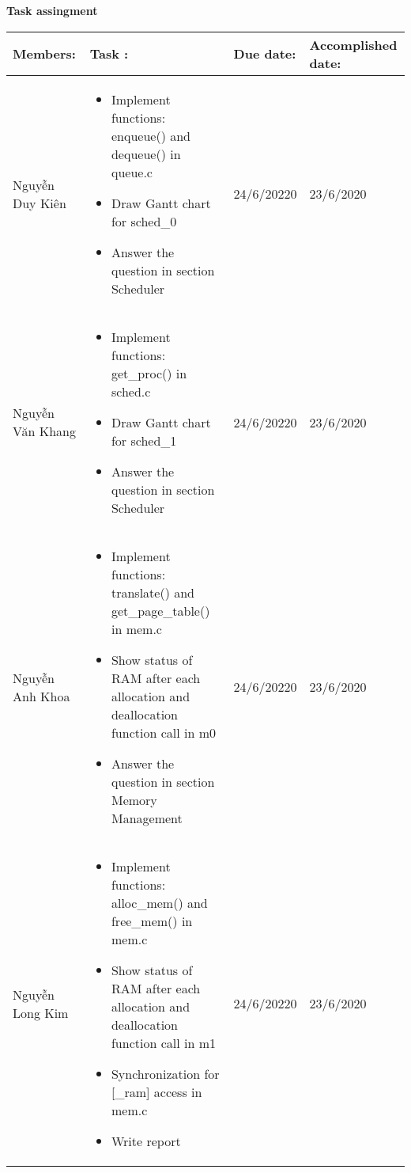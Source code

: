 \newpage
\textbf{Task assingment}
\begin{center}
    \begin{tabular}{|p{3cm}|p{7cm}|p{2.5cm}|p{3cm}|}
        \hline
         Members: & Task : & Due date: & Accomplished date:\\
         \hline
          Nguyễn Duy Kiên &
          \begin{itemize}
              	\item Implement functions: enqueue() and dequeue() in queue.c
		\item Draw Gantt chart for sched\_0
		\item Answer the question in section Scheduler
          \end{itemize} &
          24/6/20220 &
	23/6/2020 \\
         \hline
          Nguyễn Văn Khang &
          \begin{itemize}
              	\item Implement functions: get\_proc() in sched.c
              	\item Draw Gantt chart for sched\_1
		\item Answer the question in section Scheduler
          \end{itemize} &
          24/6/20220 &
	23/6/2020 \\
         \hline
          Nguyễn Anh Khoa &
          \begin{itemize}
              	\item Implement functions: translate() and get\_page\_table() in mem.c
             	\item Show status of RAM after each allocation and deallocation function call in m0
		\item Answer the question in section Memory Management
          \end{itemize} &
          24/6/20220 &
	23/6/2020 \\
         \hline
          Nguyễn Long Kim &
          \begin{itemize}
              	\item Implement functions: alloc\_mem() and free\_mem() in mem.c
              	\item Show status of RAM after each allocation and deallocation function call in m1	
		\item Synchronization for [\_ram] access in mem.c
		\item Write report
          \end{itemize} &
          24/6/20220 &
	23/6/2020 \\
        \hline
    \end{tabular}
\end{center}